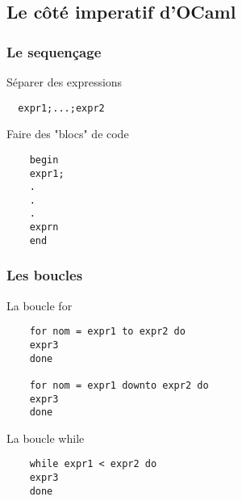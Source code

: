\subsection{Le côté imperatif d'OCaml} %

\begin{frame}[fragile]
	\frametitle{Le sequençage}
		\begin{block}{Séparer des expressions}
		\begin{lstlisting}
  expr1;...;expr2
		\end{lstlisting}
		\end{block}
		\begin{block}{Faire des "blocs" de code}
		\begin{lstlisting}
    begin
    expr1; 
    .
    .
    .
    exprn
    end
		\end{lstlisting}
		\end{block}
\end{frame}

\begin{frame}[fragile]
    \frametitle{Les boucles}
    \begin{block}{La boucle for}
	\begin{lstlisting}
	for nom = expr1 to expr2 do 
	expr3
	done

	for nom = expr1 downto expr2 do
	expr3
	done
	\end{lstlisting}
      \end{block}
	\begin{block}{La boucle while}
	\begin{lstlisting}
	while expr1 < expr2 do
	expr3
	done
      \end{lstlisting}
  \end{block}
\end{frame}
